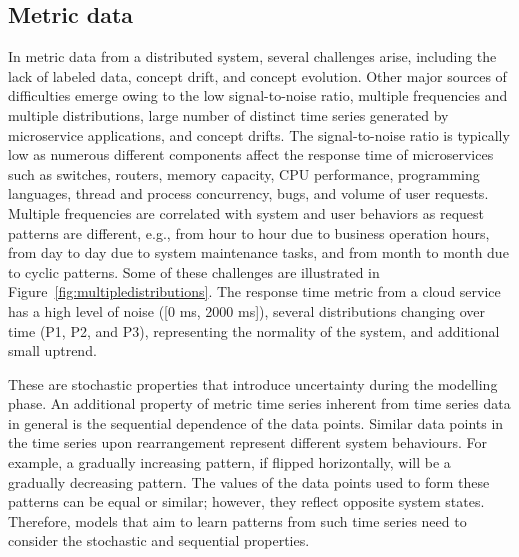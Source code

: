 \subsection{Metric data}
\label{ch:concepts:sec:anomalydetectionindistributedsoftwaresystems:subsec:metric}
In metric data from a distributed system, several challenges arise, including the lack of labeled data, concept drift, and concept evolution. Other major sources of difficulties emerge owing to the low signal-to-noise ratio, multiple frequencies and multiple distributions, large number of distinct time series generated by microservice applications, and concept drifts. The signal-to-noise ratio is typically low as numerous different components affect the response time of microservices such as switches, routers, memory capacity, CPU performance, programming languages, thread and process concurrency, bugs, and volume of user requests. Multiple frequencies are correlated with system and user behaviors as request patterns are different, e.g., from hour to hour due to business operation hours, from day to day due to system maintenance tasks, and from month to month due to cyclic patterns. Some of these challenges are illustrated in Figure~\ref{fig:multipledistributions}. The response time metric from a cloud service has a high level of noise ([0 ms, 2000 ms]), several distributions changing over time (P1, P2, and P3), representing the normality of the system, and additional small uptrend. 

These are stochastic properties that introduce uncertainty during the modelling phase. An additional property of metric time series inherent from time series data in general is the sequential dependence of the data points. Similar data points in the time series upon rearrangement represent different system behaviours. For example, a gradually increasing pattern, if flipped horizontally, will be a gradually decreasing pattern. The values of the data points used to form these patterns can be equal or similar; however, they reflect opposite system states. Therefore, models that aim to learn patterns from such time series need to consider the stochastic and sequential properties. 

